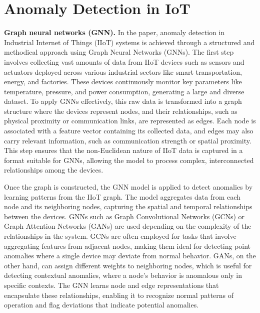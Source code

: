 \section{Anomaly Detection in IoT}

\textbf{Graph neural networks (GNN).} In the paper, anomaly detection in Industrial Internet of Things (IIoT) systems is achieved through a structured and methodical approach using Graph Neural Networks (GNNs). The first step involves collecting vast amounts of data from IIoT devices such as sensors and actuators deployed across various industrial sectors like smart transportation, energy, and factories. These devices continuously monitor key parameters like temperature, pressure, and power consumption, generating a large and diverse dataset. To apply GNNs effectively, this raw data is transformed into a graph structure where the devices represent nodes, and their relationships, such as physical proximity or communication links, are represented as edges. Each node is associated with a feature vector containing its collected data, and edges may also carry relevant information, such as communication strength or spatial proximity. This step ensures that the non-Euclidean nature of IIoT data is captured in a format suitable for GNNs, allowing the model to process complex, interconnected relationships among the devices.

Once the graph is constructed, the GNN model is applied to detect anomalies by learning patterns from the IIoT graph. The model aggregates data from each node and its neighboring nodes, capturing the spatial and temporal relationships between the devices. GNNs such as Graph Convolutional Networks (GCNs) or Graph Attention Networks (GANs) are used depending on the complexity of the relationships in the system. GCNs are often employed for tasks that involve aggregating features from adjacent nodes, making them ideal for detecting point anomalies where a single device may deviate from normal behavior. GANs, on the other hand, can assign different weights to neighboring nodes, which is useful for detecting contextual anomalies, where a node's behavior is anomalous only in specific contexts. The GNN learns node and edge representations that encapsulate these relationships, enabling it to recognize normal patterns of operation and flag deviations that indicate potential anomalies.

